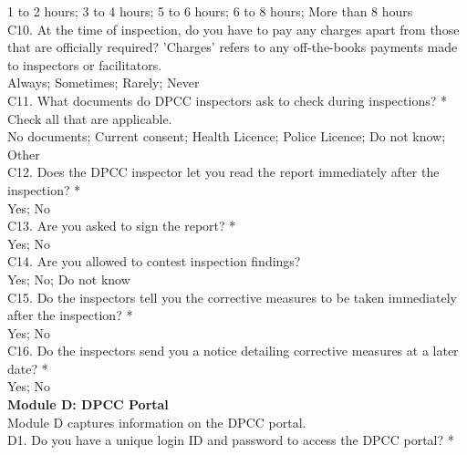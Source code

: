 \documentclass[a4paper, 12pt, twoside]{article}
\begin{document}
\begin{mdframed}[backgroundcolor=gray!20]
		1 to 2 hours; 3 to 4 hours; 5 to 6 hours; 6 to 8 hours; More than 8 hours \\
		
		C10. At the time of inspection, do you have to pay any charges apart from those that are officially required? 'Charges' refers to any off-the-books payments made to inspectors or facilitators. \\
		
		Always; Sometimes; Rarely; Never \\
		
		C11. What documents do DPCC inspectors ask to check during inspections? * Check all that are applicable. \\
		
		No documents; Current consent; Health Licence; Police Licence; Do not know; Other \\
		
		C12. Does the DPCC inspector let you read the report immediately after the inspection? * \\
		
		Yes; No \\
		
		C13. Are you asked to sign the report? * \\
		
		Yes; No \\
		
		C14. Are you allowed to contest inspection findings? \\
		
		Yes; No; Do not know \\
		
		C15. Do the inspectors tell you the corrective measures to be taken immediately after the inspection? * \\
		
		Yes; No \\
		
		C16. Do the inspectors send you a notice detailing corrective measures at a later date? * \\
		
		Yes; No \\
		
		\textbf{Module D: DPCC Portal} \\
		
		Module D captures information on the DPCC portal. \\
		
		D1. Do you have a unique login ID and password to access the DPCC portal? * \\
		

\end{mdframed}
\end{document}
